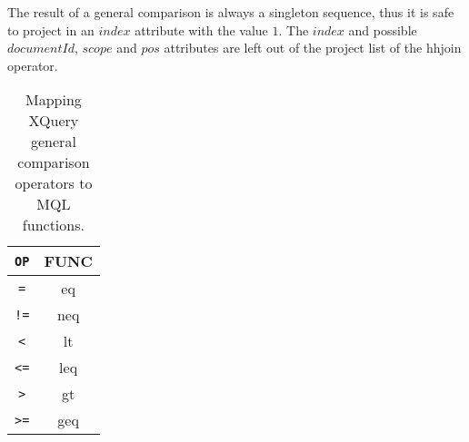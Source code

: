 The result of a general comparison is always a singleton sequence, thus it is safe to project in an $index$
attribute with the value $1$. The $index$ and possible $documentId$, $scope$ and $pos$ attributes are left out of
the project list of the \textsf{hhjoin} operator.

\begin{table}[h]
\centering
\begin{tabular}{c|c}
\texttt{OP} & \textsf{FUNC} \\ \hline
\texttt{=} & \textsf{eq} \\
\texttt{!=} & \textsf{neq} \\
\texttt{<} & \textsf{lt} \\
\texttt{<=} & \textsf{leq} \\
\texttt{>} & \textsf{gt} \\
\texttt{>=} & \textsf{geq} \\
\end{tabular}
\caption{Mapping XQuery general comparison operators to MQL functions. \label{tab:trans:TD:genCompMap}}
\end{table}

